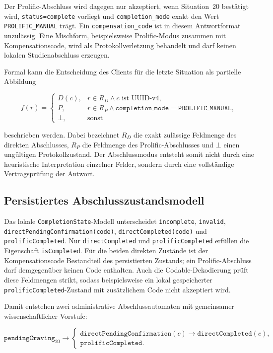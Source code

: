 \begin{neu}
Der Prolific-Abschluss wird dagegen nur akzeptiert, wenn Situation~20 bestätigt wird, \texttt{status=complete} vorliegt und \texttt{completion\_mode} exakt den Wert \texttt{PROLIFIC\_MANUAL} trägt. Ein \texttt{compensation\_code} ist in diesem Antwortformat unzulässig. Eine Mischform, beispielsweise Prolific-Modus zusammen mit Kompensationscode, wird als Protokollverletzung behandelt und darf keinen lokalen Studienabschluss erzeugen.

Formal kann die Entscheidung des Clients für die letzte Situation als partielle Abbildung

\[
f(r)=
\begin{cases}
D(c), & r \in R_D \land c\text{ ist UUID-v4},\\
P, & r \in R_P \land \texttt{completion\_mode}=\texttt{PROLIFIC\_MANUAL},\\
\bot, & \text{sonst}
\end{cases}
\]

beschrieben werden. Dabei bezeichnet \(R_D\) die exakt zulässige Feldmenge des direkten Abschlusses, \(R_P\) die Feldmenge des Prolific-Abschlusses und \(\bot\) einen ungültigen Protokollzustand. Der Abschlussmodus entsteht somit nicht durch eine heuristische Interpretation einzelner Felder, sondern durch eine vollständige Vertragsprüfung der Antwort.

\subsection{Persistiertes Abschlusszustandsmodell}

Das lokale \texttt{CompletionState}-Modell unterscheidet \texttt{incomplete}, \texttt{invalid}, \texttt{directPendingConfirmation(code)}, \texttt{directCompleted(code)} und \texttt{prolificCompleted}. Nur \texttt{directCompleted} und \texttt{prolificCompleted} erfüllen die Eigenschaft \texttt{isCompleted}. Für die beiden direkten Zustände ist der Kompensationscode Bestandteil des persistierten Zustands; ein Prolific-Abschluss darf demgegenüber keinen Code enthalten. Auch die Codable-Dekodierung prüft diese Feldmengen strikt, sodass beispielsweise ein lokal gespeicherter \texttt{prolificCompleted}-Zustand mit zusätzlichem Code nicht akzeptiert wird.

Damit entstehen zwei administrative Abschlussautomaten mit gemeinsamer wissenschaftlicher Vorstufe:

\[
\texttt{pendingCraving}_{20}
\rightarrow
\begin{cases}
\texttt{directPendingConfirmation}(c)
\rightarrow
\texttt{directCompleted}(c),\\
\texttt{prolificCompleted}.
\end{cases}
\]


\end{neu}
